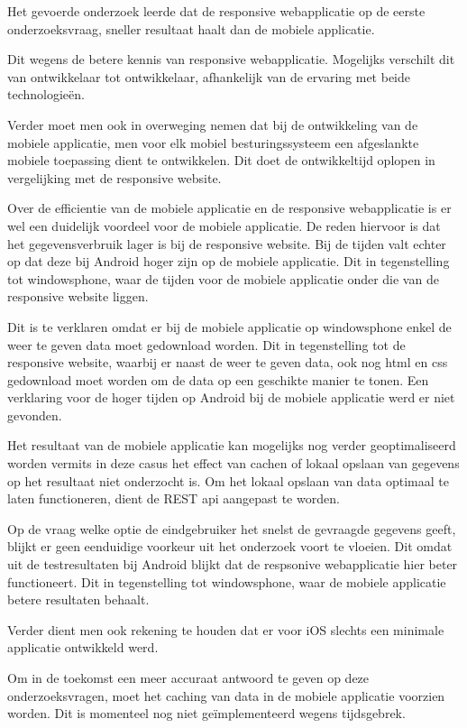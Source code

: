 Het gevoerde onderzoek leerde dat de responsive webapplicatie op de eerste onderzoeksvraag, sneller resultaat haalt dan de mobiele applicatie.

Dit wegens de betere kennis van responsive webapplicatie. Mogelijks verschilt dit van ontwikkelaar tot ontwikkelaar,
afhankelijk van de ervaring met beide technologieën.

Verder moet men ook in overweging nemen dat bij de ontwikkeling van de mobiele applicatie, men voor elk mobiel besturingssysteem een afgeslankte mobiele toepassing dient te ontwikkelen.
Dit doet de ontwikkeltijd oplopen in vergelijking met de responsive website.

Over de efficientie van de mobiele applicatie en de responsive webapplicatie is er wel een duidelijk voordeel voor de mobiele applicatie.
De reden hiervoor is dat het gegevensverbruik lager is bij de responsive website.
Bij de tijden valt echter op dat deze bij Android hoger zijn op de mobiele applicatie. Dit in tegenstelling tot windowsphone, waar de tijden voor de mobiele applicatie onder die van de responsive website liggen.

Dit is te verklaren omdat er bij de mobiele applicatie op windowsphone enkel de weer te geven data moet gedownload worden. Dit in tegenstelling tot de responsive website, waarbij er naast de weer te geven data, ook nog html
en css gedownload moet worden om de data op een geschikte manier te tonen. Een verklaring voor de hoger tijden op Android bij de mobiele applicatie werd er niet gevonden.

Het resultaat van de mobiele applicatie kan mogelijks nog verder geoptimaliseerd worden vermits in deze casus het effect van cachen of lokaal opslaan van gegevens op het resultaat niet onderzocht is.
Om het lokaal opslaan van data optimaal te laten functioneren, dient de REST api aangepast te worden.

Op de vraag welke optie de eindgebruiker het snelst de gevraagde gegevens geeft, blijkt er geen eenduidige voorkeur uit het onderzoek voort te vloeien.
Dit omdat uit de testresultaten bij Android blijkt dat de respsonive webapplicatie hier beter functioneert. Dit in tegenstelling tot windowsphone, waar de mobiele applicatie betere
resultaten behaalt.

Verder dient men ook rekening te houden dat er voor iOS slechts een minimale applicatie ontwikkeld werd.

Om in de toekomst een meer accuraat antwoord te geven op deze onderzoeksvragen, moet het caching van data in de mobiele applicatie voorzien worden.
Dit is momenteel nog niet geïmplementeerd wegens tijdsgebrek.

